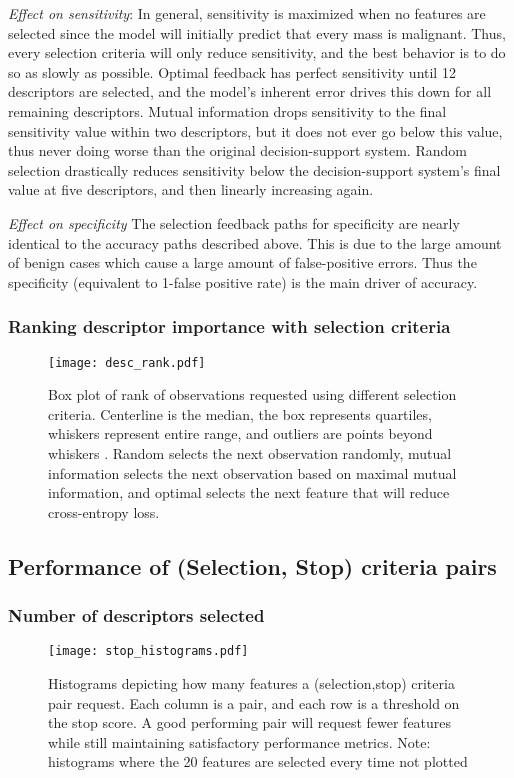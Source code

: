 \emph{Effect on sensitivity}:
In general, sensitivity is maximized when no features are selected since the model will initially predict that every mass is malignant. Thus, every selection criteria will only reduce sensitivity, and the best behavior is to do so as slowly as possible. Optimal feedback has perfect sensitivity until 12 descriptors are selected, and the model's inherent error drives this down for all remaining descriptors. Mutual information drops sensitivity to the final sensitivity value within two descriptors, but it does not ever go below this value, thus never doing worse than the original decision-support system. Random selection drastically reduces sensitivity below the decision-support system's final value at five descriptors, and then linearly increasing again.

\emph{Effect on specificity}
The selection feedback paths for specificity are nearly identical to the accuracy paths described above. This is due to the large amount of benign cases which cause a large amount of false-positive errors. Thus the specificity (equivalent to 1-false positive rate) is the main driver of accuracy.


\subsubsection{Ranking descriptor importance with selection criteria}

\begin{figure}[h]
	\centering
	\texttt{[image: desc\_rank.pdf]}
	\caption[Ranking descriptor importance with selection criteria]{Box plot of rank of observations requested using different selection criteria. Centerline is the median, the box represents quartiles, whiskers represent entire range, and outliers are points beyond whiskers . Random selects the next observation randomly, mutual information selects the next observation based on maximal mutual information, and optimal selects the next feature that will reduce cross-entropy loss.}
	\label{fig:feedback_mammo_ranks}
\end{figure}
 

 
 
\subsection{Performance of (Selection, Stop) criteria pairs}

\subsubsection{Number of descriptors selected}
\begin{figure}[h]
	\centering
	\texttt{[image: stop\_histograms.pdf]}
	\caption{Histograms depicting how many features a (selection,stop) criteria pair request. Each column is a pair, and each row is a threshold on the stop score. A good performing pair will request fewer features while still maintaining satisfactory performance metrics. Note: histograms where the 20 features are selected every time not plotted}
	\label{fig:feedback_stop_histograms}
\end{figure}

